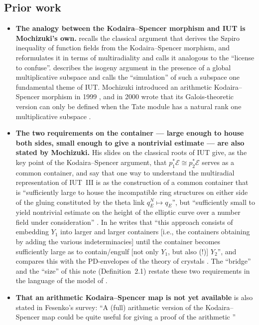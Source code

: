 \documentclass[11pt,a4paper]{article}
\numberwithin{table}{section}
\newcommand{\Ecal}{\mathcal{E}}
\newcommand{\lab}[2]{{\upshape\fcolorbox{#1}{#1!8}{\scriptsize\sffamily\bfseries\textcolor{#1}{#2}}}}
\newcommand{\tagS}{\lab{blue}{S}}
\newcommand{\tagX}{\lab{Purple}{X}}
\newcommand{\q}[1]{``#1''}
\theoremstyle{plain}
\theoremstyle{definition}
\begin{document}
\subsection{Prior work}
\begin{itemize}
\item \tagS{} \textbf{The analogy between the Kodaira--Spencer morphism and IUT is Mochizuki's own.} \cite[\S2.9]{Alien}
recalls the classical argument that derives the Szpiro inequality of function fields from the Kodaira--Spencer
morphism, and \cite[\S3.1, (v)]{Alien} reformulates it in terms of multiradiality and calls it analogous to the
``license to confuse''. \cite[\S2.3]{Alien} describes the isogeny argument in the presence of a global multiplicative
subspace and calls the ``simulation'' of such a subspace one fundamental theme of IUT. Mochizuki introduced an
arithmetic Kodaira--Spencer morphism in 1999 \cite[Chapter~IX]{HA}, and in 2000 wrote that its Galois-theoretic version
can only be defined when the Tate module has a natural rank one multiplicative subspace \cite{GalKS}.
\item \tagS{} \textbf{The two requirements on the container --- large enough to house both sides, small enough to give
a nontrivial estimate --- are also stated by Mochizuki.} His slides on the classical roots of IUT give, as the key
point of the Kodaira--Spencer argument, that $p_1^*\Ecal\cong p_2^*\Ecal$ serves as a common container, and say that
one way to understand the multiradial representation of IUT~III is as the construction of a common container that is
\q{sufficiently large to house the incompatible ring structures on either side of the gluing constituted by the theta
link $q_E^N\mapsto q_E$}, but \q{sufficiently small to yield nontrivial estimate on the height of the elliptic curve
over a number field under consideration} \cite[\S2]{Roots}. In \cite[\S3.10, (ii), (iii)]{EssLgc} he writes that
\q{this approach consists of embedding $Y_1$ into larger and larger containers [i.e., the containers obtaining by
adding the various indeterminacies] until the container becomes sufficiently large as to contain/engulf [not only
$Y_1$, but also (!)] $Y_2$}, and compares this with the PD-envelopes of the theory of crystals \cite{EssLgc}. The
``bridge'' and the ``size'' of this note (Definition~2.1) restate these two requirements in the language of the model
of \cite{SL}.
\item \tagX{} \textbf{That an arithmetic Kodaira--Spencer map is not yet available} is also stated in Fesenko's survey:
\q{A (full) arithmetic version of the Kodaira--Spencer map could be quite useful for giving a proof of the arithmetic
}
\end{itemize}
\end{document}
